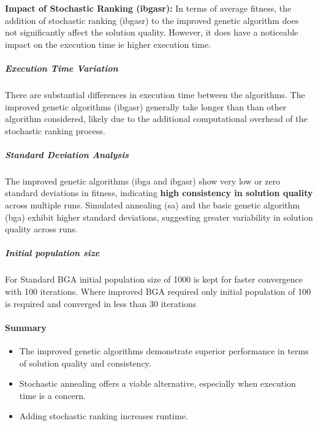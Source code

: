 \documentclass[
]{article}
\begin{document}
\textbf{Impact of Stochastic Ranking (ibgasr):} In terms of average
fitness, the addition of stochastic ranking (ibgasr) to the improved
genetic algorithm does not significantly affect the solution quality.
However, it does have a noticeable impact on the execution time ie
higher execution time.

\subparagraph{Execution Time Variation}\label{execution-time-variation}

There are substantial differences in execution time between the
algorithms. The improved genetic algorithms (ibgasr) generally take
longer than than other algorithm considered, likely due to the
additional computational overhead of the stochastic ranking process.

\subparagraph{Standard Deviation
Analysis}\label{standard-deviation-analysis}

The improved genetic algorithms (ibga and ibgasr) show very low or zero
standard deviations in fitness, indicating \textbf{high consistency in
solution quality} across multiple runs. Simulated annealing (sa) and the
basic genetic algorithm (bga) exhibit higher standard deviations,
suggesting greater variability in solution quality across runs.

\subparagraph{Initial population size}\label{initial-population-size}

For Standard BGA initial population size of 1000 is kept for faster
convergence with 100 iterations. Where improved BGA required only
initial population of 100 is required and converged in less than 30
iterations

\paragraph{Summary}\label{summary}

\begin{itemize}
\item
  The improved genetic algorithms demonstrate superior performance in
  terms of solution quality and consistency.
\item
  Stochastic annealing offers a viable alternative, especially when
  execution time is a concern.
\item
  Adding stochastic ranking increases runtime.
\end{itemize}
\end{document}
